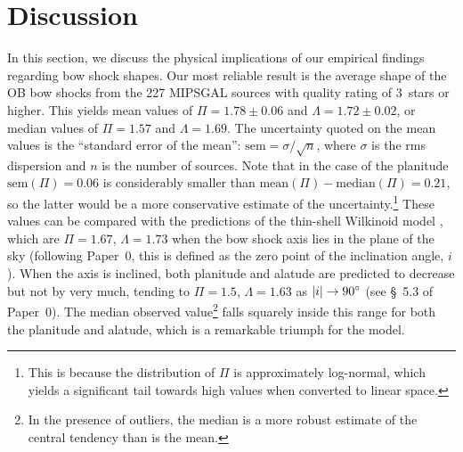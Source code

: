
\section{Discussion}
\label{sec:discussion}

In this section, we discuss the physical implications of our empirical
findings regarding bow shock shapes.  Our most reliable result is the
average shape of the OB bow shocks from the 227 MIPSGAL sources with
quality rating of 3~stars or higher.  This yields mean values of
\(\Pi = 1.78 \pm 0.06\) and \(\Lambda = 1.72 \pm 0.02\), or median values of
\(\Pi = 1.57\) and \(\Lambda = 1.69\).  The uncertainty quoted on the mean
values is the ``standard error of the mean'':
\(\text{sem} = \sigma / \sqrt{n}\), where \(\sigma\) is the rms dispersion and
\(n\) is the number of sources.  Note that in the case of the
planitude \(\text{sem}(\Pi) = 0.06\) is considerably smaller than
\(\text{mean}(\Pi) - \text{median}(\Pi) = 0.21\), so the latter would be a
more conservative estimate of the uncertainty.\footnote{This is
  because the distribution of \(\Pi\) is approximately log-normal, which
  yields a significant tail towards high values when converted to
  linear space.}  These values can be compared with the predictions of
the thin-shell Wilkinoid model \citep{Wilkin:1996a}, which are
\(\Pi = 1.67\), \(\Lambda = 1.73\) when the bow shock axis lies in the plane
of the sky (following Paper~0, this is defined as the zero point of
the inclination angle, \(i\)).  When the axis is inclined, both
planitude and alatude are predicted to decrease but not by very much,
tending to \(\Pi = 1.5\), \(\Lambda = 1.63\) as
\(\lvert i\rvert \to \ang{90}\) (see \S~5.3 of Paper~0).  The median observed
value\footnote{In the presence of outliers, the median is a more
  robust estimate of the central tendency than is the mean.} falls
squarely inside this range for both the planitude and alatude, which
is a remarkable triumph for the \citet{Wilkin:1996a} model.

